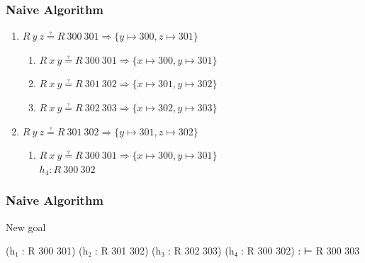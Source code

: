 \begin{frame}
  \frametitle{Naive Algorithm}

  \begin{enumerate}[<+->]
    \item $R~y~z ≟ R~300~301 ⇒ \{y ↦ 300, z ↦ 301\}$ \good
          \begin{enumerate}[<+->]
            \item $R~x~y ≟ R~300~301 ⇒ \{x ↦ 300, y ↦ 301\}$ \bad
            \item $R~x~y ≟ R~301~302 ⇒ \{x ↦ 301, y ↦ 302\}$ \bad
            \item $R~x~y ≟ R~302~303 ⇒ \{x ↦ 302, y ↦ 303\}$ \bad
          \end{enumerate}
    \item $R~y~z ≟ R~301~302 ⇒ \{y ↦ 301, z ↦ 302\}$ \good
          \begin{enumerate}[<+->]
            \item $R~x~y ≟ R~300~301 ⇒ \{x ↦ 300, y ↦ 301\}$ \good \\
                   $h_{4} : R~300~302$
          \end{enumerate}
  \end{enumerate}
\end{frame}

\begin{frame}[fragile]
  \frametitle{Naive Algorithm}

  \begin{block}{New goal}
    \begin{leancode}
        (h₁ : R 300 301)
        (h₂ : R 301 302)
        (h₃ : R 302 303)
        (h₄ : R 300 302) :
        ⊢ R 300 303
    \end{leancode}
  \end{block}
\end{frame}

